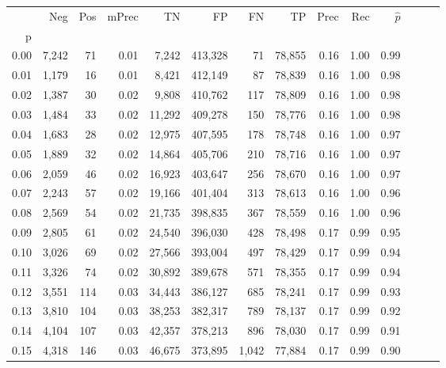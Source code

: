 \begin{tabular}{rrrrrrrrrrrrrr}
\toprule
{} &    Neg &    Pos & mPrec &       TN &       FP &      FN &      TP &  Prec &   Rec & $\hat{p}$ \\
p    &        &        &       &          &          &         &         &       &       &           \\
\midrule
0.00 &  7,242 &     71 &  0.01 &    7,242 &  413,328 &      71 &  78,855 &  0.16 &  1.00 &      0.99 \\
0.01 &  1,179 &     16 &  0.01 &    8,421 &  412,149 &      87 &  78,839 &  0.16 &  1.00 &      0.98 \\
0.02 &  1,387 &     30 &  0.02 &    9,808 &  410,762 &     117 &  78,809 &  0.16 &  1.00 &      0.98 \\
0.03 &  1,484 &     33 &  0.02 &   11,292 &  409,278 &     150 &  78,776 &  0.16 &  1.00 &      0.98 \\
0.04 &  1,683 &     28 &  0.02 &   12,975 &  407,595 &     178 &  78,748 &  0.16 &  1.00 &      0.97 \\
0.05 &  1,889 &     32 &  0.02 &   14,864 &  405,706 &     210 &  78,716 &  0.16 &  1.00 &      0.97 \\
0.06 &  2,059 &     46 &  0.02 &   16,923 &  403,647 &     256 &  78,670 &  0.16 &  1.00 &      0.97 \\
0.07 &  2,243 &     57 &  0.02 &   19,166 &  401,404 &     313 &  78,613 &  0.16 &  1.00 &      0.96 \\
0.08 &  2,569 &     54 &  0.02 &   21,735 &  398,835 &     367 &  78,559 &  0.16 &  1.00 &      0.96 \\
0.09 &  2,805 &     61 &  0.02 &   24,540 &  396,030 &     428 &  78,498 &  0.17 &  0.99 &      0.95 \\
0.10 &  3,026 &     69 &  0.02 &   27,566 &  393,004 &     497 &  78,429 &  0.17 &  0.99 &      0.94 \\
0.11 &  3,326 &     74 &  0.02 &   30,892 &  389,678 &     571 &  78,355 &  0.17 &  0.99 &      0.94 \\
0.12 &  3,551 &    114 &  0.03 &   34,443 &  386,127 &     685 &  78,241 &  0.17 &  0.99 &      0.93 \\
0.13 &  3,810 &    104 &  0.03 &   38,253 &  382,317 &     789 &  78,137 &  0.17 &  0.99 &      0.92 \\
0.14 &  4,104 &    107 &  0.03 &   42,357 &  378,213 &     896 &  78,030 &  0.17 &  0.99 &      0.91 \\
0.15 &  4,318 &    146 &  0.03 &   46,675 &  373,895 &   1,042 &  77,884 &  0.17 &  0.99 &      0.90 \\

\end{tabular}
